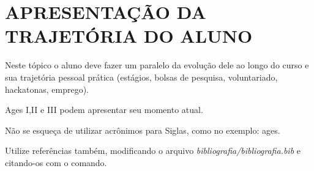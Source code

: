 \chapter[APRESENTAÇÃO DA TRAJETÓRIA DO ALUNO]{APRESENTAÇÃO DA TRAJETÓRIA DO ALUNO}

Neste tópico o aluno deve fazer um paralelo da evolução dele ao longo do curso e sua trajetória pessoal prática (estágios, bolsas de pesquisa, voluntariado, hackatonas, emprego).
  
Ages I,II e III podem apresentar seu momento atual.

Não se esqueça de utilizar acrônimos para Siglas, como no exemplo: \ac{ages}.

Utilize referências também, modificando o arquivo \textit{bibliografia/bibliografia.bib} e citando-os com o comando\cite{artigo}.
    